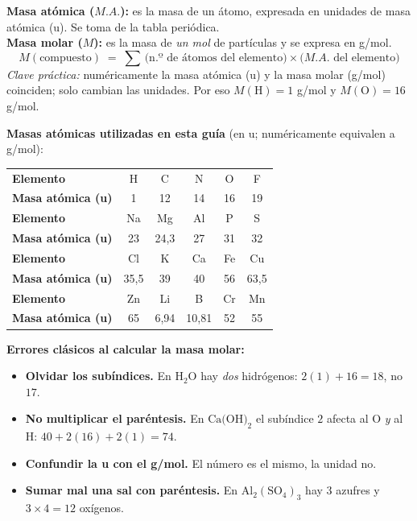 \documentclass[12pt, letterpaper]{article}
\begin{document}
\begin{cuadroteoria}
  \textbf{Masa atómica ($M.A.$):} es la masa de un átomo, expresada en unidades de masa atómica (u). Se toma de la tabla periódica.\\
  \textbf{Masa molar ($M$):} es la masa de \emph{un mol} de partículas y se expresa en g/mol.
  \[
    M(\text{compuesto}) \;=\; \sum\, \bigl(\text{n.º de átomos del elemento}\bigr)\times \bigl(M.A.\text{ del elemento}\bigr)
  \]
  \emph{Clave práctica:} numéricamente la masa atómica (u) y la masa molar (g/mol) coinciden; solo cambian las unidades. Por eso $M(\text{H}) = 1$ g/mol y $M(\text{O}) = 16$ g/mol.
\end{cuadroteoria}

\noindent\textbf{Masas atómicas utilizadas en esta guía} (en u; numéricamente equivalen a g/mol):\par\nobreak
\vspace{2pt}\nobreak
\begin{center}
  \small
  \setlength{\tabcolsep}{6pt}
  \begin{tabular}{lccccc}
    \toprule
    \textbf{Elemento}            & H  & C  & N  & O  & F \\
    \textbf{Masa atómica (u)}    & 1  & 12 & 14 & 16 & 19 \\
    \midrule
    \textbf{Elemento}            & Na & Mg   & Al & P  & S \\
    \textbf{Masa atómica (u)}    & 23 & 24,3 & 27 & 31 & 32 \\
    \midrule
    \textbf{Elemento}            & Cl   & K  & Ca & Fe & Cu \\
    \textbf{Masa atómica (u)}    & 35,5 & 39 & 40 & 56 & 63,5 \\
    \midrule
    \textbf{Elemento}            & Zn & Li   & B     & Cr & Mn \\
    \textbf{Masa atómica (u)}    & 65 & 6,94 & 10,81 & 52 & 55 \\
    \bottomrule
  \end{tabular}
\end{center}

\begin{cuadroadvertencia}
  \textbf{Errores clásicos al calcular la masa molar:}
  \begin{itemize}[leftmargin=*]
    \item \textbf{Olvidar los subíndices.} En $\text{H}_2\text{O}$ hay \emph{dos} hidrógenos: $2(1) + 16 = 18$, no $17$.
    \item \textbf{No multiplicar el paréntesis.} En $\text{Ca(OH)}_2$ el subíndice $2$ afecta al O \emph{y} al H: $40 + 2(16) + 2(1) = 74$.
    \item \textbf{Confundir la u con el g/mol.} El número es el mismo, la unidad no.
    \item \textbf{Sumar mal una sal con paréntesis.} En $\text{Al}_2(\text{SO}_4)_3$ hay $3$ azufres y $3\times4 = 12$ oxígenos.
  \end{itemize}
\end{cuadroadvertencia}
\end{document}
